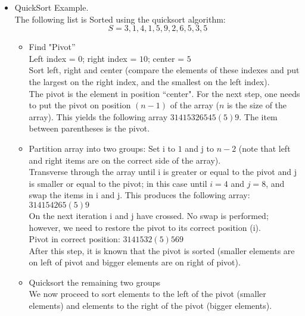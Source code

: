\documentclass{article}
\begin{document}
\begin{itemize}
\item QuickSort Example.\\
The following list is Sorted using the quicksort algorithm:\\
$$S = 3, 1, 4, 1, 5, 9, 2, 6, 5, 3, 5$$

\begin{itemize}
\item Find "Pivot''\\
Left index = $0$; right index = $10$; center = $5$\\
Sort left, right and center (compare the elements of these indexes and
put the largest on the right index, and the smallest on the left
index).\\
The pivot is the element in position ``center". For the next step, one
needs to put the pivot on position $(n - 1)$ of the array ($n$ is the
size of the array). This yields the following array $3 1 4 1 5 3 2 6
5 4 5 (5) 9$. The item between parentheses is the pivot.\\
\item Partition array into two groups:
Set i to $1$ and j to $n - 2$ (note that left and  right items are on
the
correct side of the array).\\
Transverse through the array until i is greater or equal to the pivot
and j
is smaller or equal to the pivot; in this case until $i = 4$ and
$j = 8$, and swap the items in i and j. This produces the following
array:
$3 1 4 1 5 4 2 6 5 (5) 9$\\
On the next iteration i and j have crossed. No swap is performed;
however, we need to restore the pivot to its correct position (i).\\
Pivot in correct position: $3 1 4 1 5 3 2 (5) 5 6 9$\\
After this step, it is known that the pivot is sorted (smaller elements
are on left of pivot and bigger elements are on right of pivot).\\
\item Quicksort the remaining two groups \\
We now proceed to sort elements to the left of the pivot (smaller
elements) and elements to the right of the pivot (bigger
elements).\\
\end{itemize}


\end{itemize}
\end{document}
